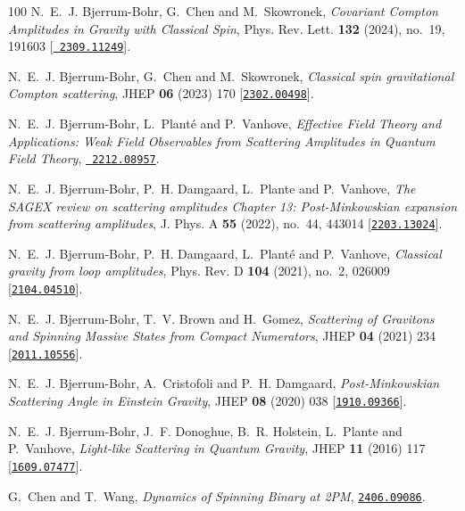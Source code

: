 \begin{thebibliography}{100}
N.~E.~J. Bjerrum-Bohr, G.~Chen and M.~Skowronek,  {\em {Covariant Compton
  Amplitudes in Gravity with Classical Spin}}, Phys. Rev. Lett. {\bf 132}
  (2024), no.~19, 191603 [\href{http://www.arXiv.org/abs/2309.11249}{{\tt
  2309.11249}}].

N.~E.~J. Bjerrum-Bohr, G.~Chen and M.~Skowronek,  {\em {Classical spin
  gravitational Compton scattering}}, JHEP {\bf 06} (2023) 170
  [\href{http://www.arXiv.org/abs/2302.00498}{{\tt 2302.00498}}].

N.~E.~J. Bjerrum-Bohr, L.~Plant\'e and P.~Vanhove,  {\em {Effective Field
  Theory and Applications: Weak Field Observables from Scattering Amplitudes in
  Quantum Field Theory}}, \href{http://www.arXiv.org/abs/2212.08957}{{\tt
  2212.08957}}.

N.~E.~J. Bjerrum-Bohr, P.~H. Damgaard, L.~Plante and P.~Vanhove,  {\em {The
  SAGEX review on scattering amplitudes Chapter 13: Post-Minkowskian expansion
  from scattering amplitudes}}, J. Phys. A {\bf 55} (2022), no.~44, 443014
  [\href{http://www.arXiv.org/abs/2203.13024}{{\tt 2203.13024}}].

N.~E.~J. Bjerrum-Bohr, P.~H. Damgaard, L.~Plant\'e and P.~Vanhove,  {\em
  {Classical gravity from loop amplitudes}}, Phys. Rev. D {\bf 104} (2021),
  no.~2, 026009 [\href{http://www.arXiv.org/abs/2104.04510}{{\tt 2104.04510}}].

N.~E.~J. Bjerrum-Bohr, T.~V. Brown and H.~Gomez,  {\em {Scattering of Gravitons
  and Spinning Massive States from Compact Numerators}}, JHEP {\bf 04} (2021)
  234 [\href{http://www.arXiv.org/abs/2011.10556}{{\tt 2011.10556}}].

N.~E.~J. Bjerrum-Bohr, A.~Cristofoli and P.~H. Damgaard,  {\em
  {Post-Minkowskian Scattering Angle in Einstein Gravity}}, JHEP {\bf 08}
  (2020) 038 [\href{http://www.arXiv.org/abs/1910.09366}{{\tt 1910.09366}}].

N.~E.~J. Bjerrum-Bohr, J.~F. Donoghue, B.~R. Holstein, L.~Plante and
  P.~Vanhove,  {\em {Light-like Scattering in Quantum Gravity}}, JHEP {\bf 11}
  (2016) 117 [\href{http://www.arXiv.org/abs/1609.07477}{{\tt 1609.07477}}].

G.~Chen and T.~Wang,  {\em {Dynamics of Spinning Binary at 2PM}},
  \href{http://www.arXiv.org/abs/2406.09086}{{\tt 2406.09086}}.


\end{thebibliography}
